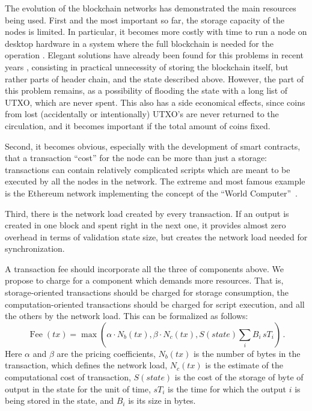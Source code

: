 \documentclass[]{llncs}   %
\newcommand{\authnote}[2]{\marginpar{\parbox{\marginparwidth}{\tiny %
  \textsf{#1 {\textcolor{blue}{notes: #2}}}}}%
  \textcolor{blue}{\textbf{\dag}}}
\newcommand{\authnote}[2]{
  \textsf{#1\textcolor{blue}{ #2}}}
\newcommand{\authnote}[2]{}
\newcommand{\knote}[1]{{\authnote{\textcolor{green}{Alex notes:}}{#1}}}
\newcommand{\vk}[1]{{\authnote{\textcolor{red}{V:}}{#1}}}
\begin{document}
The evolution of the blockchain networks has demonstrated the main resources
being used.  First and the most important so far, the storage capacity of the
nodes is limited. In particular, it becomes more costly with time to run a node
on desktop hardware in a system where the full blockchain is needed for the
operation \vk{more details}.  Elegant solutions have already been found for this
problems in recent years \vk{citations}, consisting in practical unnecessity of
storing the blockchain itself, but rather parts of header chain, and the state
described above.  However, the part of this problem remains, as a possibility of
flooding the state with a long list of UTXO, which are never spent. This also
has a side economical effects, since coins from lost (accidentally or
intentionally) UTXO's are never returned to the circulation, and it becomes
important if the total amount of coins fixed.

Second, it becomes obvious, especially with the development of smart contracts,
that a transaction ``cost'' for the node can be more than just a storage:
transactions can contain relatively complicated scripts which are meant to be
executed by all the nodes in the network. The extreme and most famous example is
the Ethereum network implementing the concept of the ``World Computer''~\cite{ethyp}. 

Third, there is the network load created by every transaction. If an output is
created in one block and spent right in the next one, it provides almost zero
overhead in terms of validation state size, but creates the network load needed
for synchronization.

\knote{refer here to a fee as a security measure concepts in the intro?}

A transaction fee should incorporate all the three of components above. We
propose to charge for a component which demands more resources. That is,
storage-oriented transactions should be charged for storage consumption, the
computation-oriented transactions should be charged for script execution, and
all the others by the network load. This can be formalized as follows:
\begin{equation}
    \operatorname{Fee}(tx) = \max\left(\alpha \cdot N_b(tx), \beta \cdot N_c(tx),
    S(state) \sum_i B_i\, sT_i\right)\,.
    \label{eq:max}
\end{equation}
Here $\alpha$ and $\beta$ are the pricing coefficients, $N_b(tx)$ is the number
of bytes in the transaction, which defines the network load, $N_c(tx)$ is the
estimate of the computational cost of transaction, $S(state)$ is the cost of the
storage of byte of output in the state for the unit of time, $sT_i$ is the time
for which the output $i$ is being stored in the state, and $B_i$ is its size in
bytes.
\end{document}
